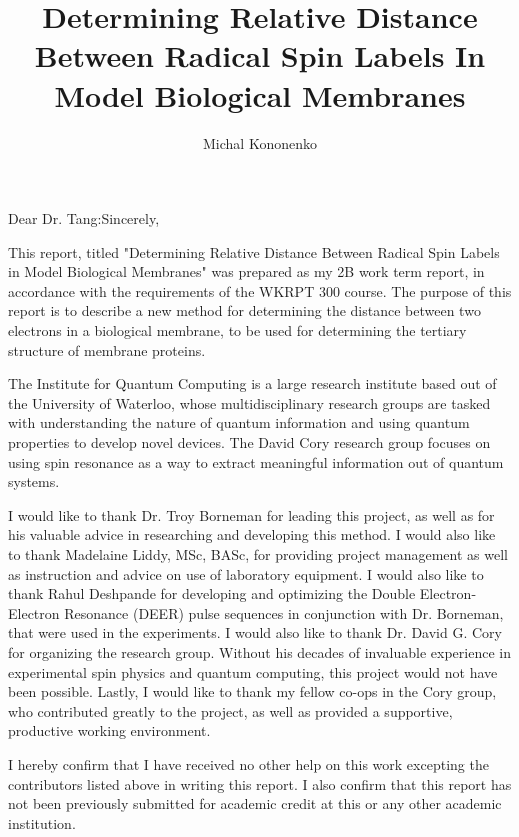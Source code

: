 \documentclass{workreport}
\title{
    Determining Relative Distance Between Radical Spin Labels
    In Model Biological Membranes
}
\author{Michal Kononenko}
\begin{document}
\maketitlepage

\begin{letter_of_submittal}{Dear Dr. Tang:}{Sincerely,}

	This report, titled "Determining Relative Distance Between Radical Spin Labels in Model Biological Membranes" was prepared as my 2B work term report, in accordance with the requirements of the WKRPT 300 course. The purpose of this report is to describe a new method for determining the distance between two electrons in a biological membrane, to be used for determining the tertiary structure of membrane proteins.
	
	The Institute for Quantum Computing is a large research institute based out of the University of Waterloo, whose multidisciplinary research groups are tasked with understanding the nature of quantum information and using quantum properties to develop novel devices. The David Cory research group focuses on using spin resonance as a way to extract meaningful information out of quantum systems.
	
	I would like to thank Dr. Troy Borneman for leading this project, as well as for his valuable advice in researching and developing this method. I would also like to thank Madelaine Liddy, MSc, BASc, for providing project management as well as instruction and advice on use of laboratory equipment. I would also like to thank Rahul Deshpande for developing and optimizing the Double Electron-Electron Resonance (DEER) pulse sequences in conjunction with Dr. Borneman, that were used in the experiments. I would also like to thank Dr. David G. Cory for organizing the research group. Without his decades of invaluable experience in experimental spin physics and quantum computing, this project would not have been possible. Lastly, I would like to thank my fellow co-ops in the Cory group, who contributed greatly to the project, as well as provided a supportive, productive working environment.
	
	I hereby confirm that I have received no other help on this work excepting the contributors listed above in writing this report. I also confirm that this report has not been previously submitted for academic credit at this or any other academic institution.
	
\end{letter_of_submittal}

\toctree
\end{document}
